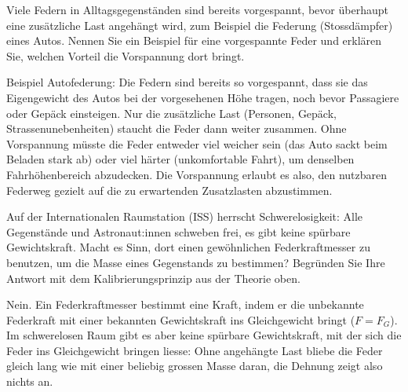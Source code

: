 \documentclass[addpoints,11pt,a4paper]{exam}
\newlength{\antwortraumlen}
\newcommand{\Antwortraum}[1]{%
  \pgfmathsetlength{\antwortraumlen}{#1*2.5cm}%
  \begin{answerbox}
    \rule{0pt}{\antwortraumlen}%
  \end{answerbox}%
}
\begin{document}
\begin{questions}
\begin{taskbox}
\question[3] Viele Federn in Alltagsgegenständen sind bereits vorgespannt,
bevor überhaupt eine zusätzliche Last angehängt wird, zum Beispiel die
Federung (Stossdämpfer) eines Autos. Nennen Sie ein Beispiel für eine
vorgespannte Feder und erklären Sie, welchen Vorteil die Vorspannung dort
bringt.
\Antwortraum{3}
\begin{solution}
Beispiel Autofederung: Die Federn sind bereits so vorgespannt, dass sie
das Eigengewicht des Autos bei der vorgesehenen Höhe tragen, noch bevor
Passagiere oder Gepäck einsteigen. Nur die zusätzliche Last (Personen,
Gepäck, Strassenunebenheiten) staucht die Feder dann weiter zusammen.
Ohne Vorspannung müsste die Feder entweder viel weicher sein (das Auto
sackt beim Beladen stark ab) oder viel härter (unkomfortable Fahrt), um
denselben Fahrhöhenbereich abzudecken. Die Vorspannung erlaubt es also,
den nutzbaren Federweg gezielt auf die zu erwartenden Zusatzlasten
abzustimmen.
\end{solution}
\end{taskbox}
\end{questions}

\begin{questions}
\begin{taskbox}
\question[2] Auf der Internationalen Raumstation (ISS) herrscht
Schwerelosigkeit: Alle Gegenstände und Astronaut:innen schweben frei, es
gibt keine spürbare Gewichtskraft. Macht es Sinn, dort einen gewöhnlichen
Federkraftmesser zu benutzen, um die Masse eines Gegenstands zu
bestimmen? Begründen Sie Ihre Antwort mit dem Kalibrierungsprinzip aus
der Theorie oben.
\Antwortraum{2}
\begin{solution}
Nein. Ein Federkraftmesser bestimmt eine Kraft, indem er die unbekannte
Federkraft mit einer bekannten Gewichtskraft ins Gleichgewicht bringt
($F=F_G$). Im schwerelosen Raum gibt es aber keine spürbare Gewichtskraft,
mit der sich die Feder ins Gleichgewicht bringen liesse: Ohne angehängte
Last bliebe die Feder gleich lang wie mit einer beliebig grossen Masse
daran, die Dehnung zeigt also nichts an.
\end{solution}
\end{taskbox}
\end{questions}
\end{document}

